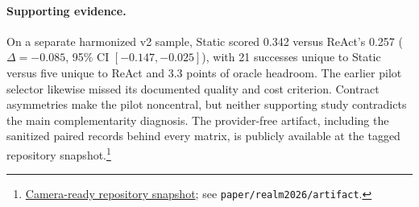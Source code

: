 \paragraph{Supporting evidence.}
On a separate harmonized v2 sample, Static scored 0.342 versus ReAct's 0.257
($\Delta=-0.085$, 95\% CI $[-0.147,-0.025]$), with 21 successes unique to Static
versus five unique to ReAct and 3.3 points of oracle headroom. The earlier pilot
selector likewise missed its documented quality and cost criterion. Contract
asymmetries make the pilot noncentral, but neither supporting study contradicts
the main complementarity diagnosis. The provider-free artifact, including the
sanitized paired records behind every matrix, is publicly available at the
tagged repository snapshot.\footnote{\href{https://github.com/rishisim/nexus/tree/realm-emnlp-2026-camera-ready}{Camera-ready repository snapshot}; see \texttt{paper/realm2026/artifact}.}
